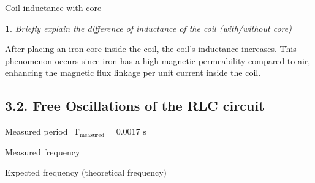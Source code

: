 \documentclass[12pt,oneside,a4paper]{article}
\theoremstyle{definition}
\newtheorem{bt}{}
\begin{document}
	Coil inductance with core
	\begin{center}
	\end{center} 
	
	\begin{bt}
		\textit{Briefly explain the difference of inductance of the coil (with/without core)}
	\end{bt}
	After placing an iron core inside the coil, the coil's inductance increases. This phenomenon occurs since iron has a high magnetic permeability compared to air, enhancing the magnetic flux linkage per unit current inside the coil.
	
	\subsection*{3.2. Free Oscillations of the RLC circuit}
	\hspace{1.23em}
	Measured period $\text{ T}_{\text{measured}} = 0.0017 \text{ s}$
	
	\vspace{0.2cm}
	Measured frequency
	\begin{center}
	\end{center}
	
	Expected frequency (theoretical frequency)
	\begin{center}
	\end{center}
	
\end{document}
